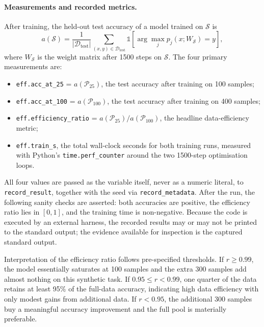 \documentclass{article}
\begin{document}
\paragraph{Measurements and recorded metrics.}
After training, the held-out test accuracy of a model trained on \(\mathcal{S}\) is
\begin{equation}
a(\mathcal{S}) = \frac{1}{|\mathcal{D}_{\text{test}}|}
\sum_{(x,y) \in \mathcal{D}_{\text{test}}}
\mathbb{1}\!\left[\arg\max_j p_j(x; W_{\mathcal{S}}) = y\right],
\end{equation}
where \(W_{\mathcal{S}}\) is the weight matrix after 1500 steps on \(\mathcal{S}\). The four primary measurements are:
\begin{itemize}
    \item \texttt{eff.acc\_at\_25} = \(a(\mathcal{P}_{25})\), the test accuracy after training on 100 samples;
    \item \texttt{eff.acc\_at\_100} = \(a(\mathcal{P}_{100})\), the test accuracy after training on 400 samples;
    \item \texttt{eff.efficiency\_ratio} = \(a(\mathcal{P}_{25}) / a(\mathcal{P}_{100})\), the headline data-efficiency metric;
    \item \texttt{eff.train\_s}, the total wall-clock seconds for both training runs, measured with Python's \texttt{time.perf\_counter} around the two 1500-step optimisation loops.
\end{itemize}
All four values are passed as the variable itself, never as a numeric literal, to \texttt{record\_result}, together with the seed via \texttt{record\_metadata}. After the run, the following sanity checks are asserted: both accuracies are positive, the efficiency ratio lies in \([0,1]\), and the training time is non-negative. Because the code is executed by an external harness, the recorded results may or may not be printed to the standard output; the evidence available for inspection is the captured standard output.

Interpretation of the efficiency ratio follows pre-specified thresholds. If \(r \ge 0.99\), the model essentially saturates at 100 samples and the extra 300 samples add almost nothing on this synthetic task. If \(0.95 \le r < 0.99\), one quarter of the data retains at least 95\% of the full-data accuracy, indicating high data efficiency with only modest gains from additional data. If \(r < 0.95\), the additional 300 samples buy a meaningful accuracy improvement and the full pool is materially preferable.
\end{document}
